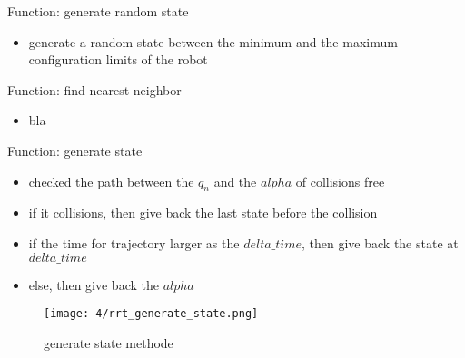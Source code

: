 \documentclass[%
  professionalfonts,%
  xcolor={%
    usenames,%
    dvipsnames,%
    svgnames,%
    table,%
    hyperref%
  }%
]{beamer}
\begin{document}
        
        \begin{frame}{Function: generate random state}
          \begin{itemize}
            \item generate a random state between the minimum and the maximum configuration limits of the robot
          \end{itemize}
          
        \end{frame}
        
        \begin{frame}{Function: find nearest neighbor}
          \begin{itemize}
            \item bla
          \end{itemize}
        \end{frame}
        
        \begin{frame}{Function: generate state}
          \begin{itemize}
            \item checked the path between the $q_n$ and the $alpha$ of collisions free
            \item if it collisions, then give back the last state before the collision
            \item if the time for trajectory larger as the $delta\_time$, then give back the state at $delta\_time$
            \item else, then give back the $alpha$
          \end{itemize}
          
          \begin{figure}[h]
            \texttt{[image: 4/rrt\_generate\_state.png]}
            \caption{generate state methode}
            \label{fig:generate state methode}
          \end{figure}
        \end{frame}
        
\end{document}
